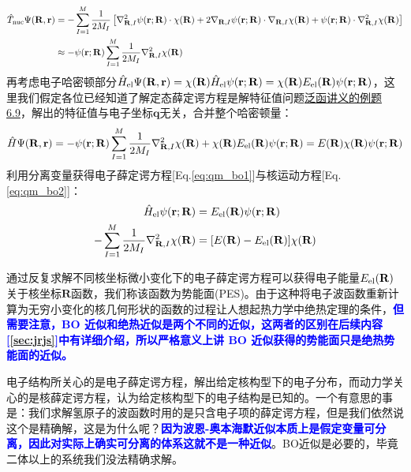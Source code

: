 \[\begin{aligned}
\hat{T}_{\rm nuc}\Psi(\mathbf{R},\mathbf{r})&=-\sum_{I=1}^M\frac{1}{2M_I}\left[\nabla^2_{\mathbf{R},I}\psi(\mathbf{r};\mathbf{R}) \cdot \chi(\mathbf{R})+2 \nabla_{\mathbf{R},I}\psi(\mathbf{r};\mathbf{R}) \cdot \nabla_{\mathbf{R},I}\chi(\mathbf{R}) + \psi(\mathbf{r};\mathbf{R}) \cdot \nabla^2_{\mathbf{R},I}\chi(\mathbf{R})  \right]\\ 
&\approx -\psi(\mathbf{r};\mathbf{R})\sum_{I=1}^M\frac{1}{2M_I}\nabla^2_{\mathbf{R},I}\chi(\mathbf{R})
\end{aligned}\]
再考虑电子哈密顿部分$\hat{H}_{\rm el}\Psi(\mathbf{R},\mathbf{r})=\chi(\mathbf{R})\hat{H}_{\rm el}\psi(\mathbf{r};\mathbf{R})=\chi(\mathbf{R})E_{\rm el}(\mathbf{R})\psi(\mathbf{r};\mathbf{R})$，这里我们假定各位已经知道了解定态薛定谔方程是解特征值问题\href{https://github.com/Astolfo-Official/Note-on-Functional-Analysis/blob/main/Note%20for%20Functional%20Analysis.pdf}{泛函讲义的例题6.9}，解出的特征值与电子坐标$\mathbf{q}$无关，合并整个哈密顿量：
\[\hat{H}\Psi(\mathbf{R},\mathbf{r})=-\psi(\mathbf{r};\mathbf{R})\sum_{I=1}^M\frac{1}{2M_I}\nabla^2_{\mathbf{R},I}\chi(\mathbf{R})+\chi(\mathbf{R})E_{\rm el}(\mathbf{R})\psi(\mathbf{r};\mathbf{R})=E(\mathbf{R})\chi(\mathbf{R})\psi(\mathbf{r};\mathbf{R})\]
利用分离变量获得电子薛定谔方程[Eq.\eqref{eq:qm_bo1}]与核运动方程[Eq.\eqref{eq:qm_bo2}]：
\begin{subequations}\label{eq:qm_bo}
\begin{align}
\hat{H}_{\rm el}\psi(\mathbf{r};\mathbf{R})&=E_{\rm el}(\mathbf{R})\psi(\mathbf{r};\mathbf{R})\label{eq:qm_bo1}\\
-\sum_{I=1}^M\frac{1}{2M_I}\nabla^2_{\mathbf{R},I}\chi(\mathbf{R})&=[E(\mathbf{R})-E_{\rm el}(\mathbf{R})]\chi(\mathbf{R})\label{eq:qm_bo2}
\end{align}
\end{subequations}

通过反复求解不同核坐标微小变化下的电子薛定谔方程可以获得电子能量$E_{\rm el}(\mathbf{R})$关于核坐标$\mathbf{R}$函数，我们称该函数为势能面(PES)。由于这种将电子波函数重新计算为无穷小变化的核几何形状的函数的过程让人想起热力学中绝热定理的条件，\textcolor{blue}{\textbf{但需要注意，BO 近似和绝热近似是两个不同的近似，这两者的区别在后续内容[\ref{sec:jrjs}]中有详细介绍，所以严格意义上讲 BO 近似获得的势能面只是绝热势能面的近似。}}

电子结构所关心的是电子薛定谔方程，解出给定核构型下的电子分布，而动力学关心的是核薛定谔方程，认为给定核构型下的电子结构是已知的。一个有意思的事是：我们求解氢原子的波函数时用的是只含电子项的薛定谔方程，但是我们依然说这个是精确解，这是为什么呢？\textcolor{blue}{\textbf{因为波恩-奥本海默近似本质上是假定变量可分离，因此对实际上确实可分离的体系这就不是一种近似}}。BO近似是必要的，毕竟二体以上的系统我们没法精确求解。

